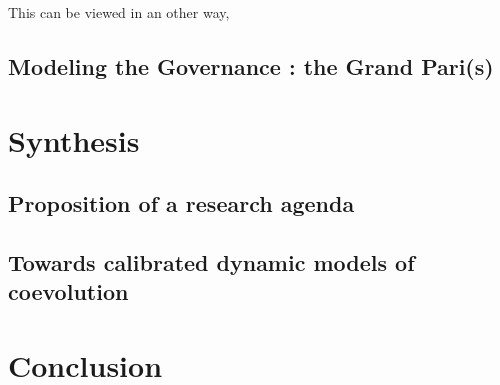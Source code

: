 This can be viewed in an other way, 


\subsection{Modeling the Governance : the Grand Pari(s)}




\section{Synthesis}


\subsection{Proposition of a research agenda}





\subsection{Towards calibrated dynamic models of coevolution}








\section{Conclusion}
















